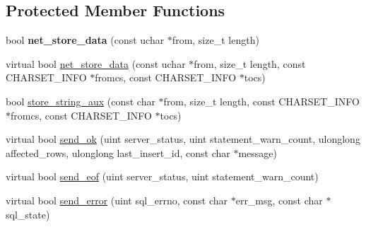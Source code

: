 \subsection*{Protected Member Functions}
\begin{DoxyCompactItemize}
\item 
\mbox{\label{classProtocol__classic_adbd041e087924aeffbbb5f9c20adf8b8}} 
bool {\bfseries net\+\_\+store\+\_\+data} (const uchar $\ast$from, size\+\_\+t length)
\item 
virtual bool \mbox{\hyperlink{classProtocol__classic_a378a497216ff06610382cb3ed1f85031}{net\+\_\+store\+\_\+data}} (const uchar $\ast$from, size\+\_\+t length, const C\+H\+A\+R\+S\+E\+T\+\_\+\+I\+N\+FO $\ast$fromcs, const C\+H\+A\+R\+S\+E\+T\+\_\+\+I\+N\+FO $\ast$tocs)
\item 
bool \mbox{\hyperlink{classProtocol__classic_aa38e38d52e62b7cfb0443ca893a6b4c6}{store\+\_\+string\+\_\+aux}} (const char $\ast$from, size\+\_\+t length, const C\+H\+A\+R\+S\+E\+T\+\_\+\+I\+N\+FO $\ast$fromcs, const C\+H\+A\+R\+S\+E\+T\+\_\+\+I\+N\+FO $\ast$tocs)
\item 
virtual bool \mbox{\hyperlink{classProtocol__classic_a482f606dfaeea989625fd9d837769f32}{send\+\_\+ok}} (uint server\+\_\+status, uint statement\+\_\+warn\+\_\+count, ulonglong affected\+\_\+rows, ulonglong last\+\_\+insert\+\_\+id, const char $\ast$message)
\item 
virtual bool \mbox{\hyperlink{classProtocol__classic_a73b13a1041c96721d6ea08b5fa0eaf50}{send\+\_\+eof}} (uint server\+\_\+status, uint statement\+\_\+warn\+\_\+count)
\item 
virtual bool \mbox{\hyperlink{classProtocol__classic_afb9c6d98e56396be053ba7d1550f2911}{send\+\_\+error}} (uint sql\+\_\+errno, const char $\ast$err\+\_\+msg, const char $\ast$sql\+\_\+state)
\end{DoxyCompactItemize}
